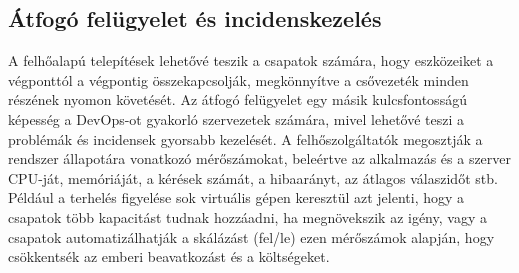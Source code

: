 \subsection*{Átfogó felügyelet és incidenskezelés}
A felhőalapú telepítések lehetővé teszik a csapatok számára, hogy eszközeiket a végponttól a végpontig összekapcsolják, megkönnyítve a csővezeték minden részének nyomon követését. Az átfogó felügyelet egy másik kulcsfontosságú képesség a DevOps-ot gyakorló szervezetek számára, mivel lehetővé teszi a problémák és incidensek gyorsabb kezelését. A felhőszolgáltatók megosztják a rendszer állapotára vonatkozó mérőszámokat, beleértve az alkalmazás és a szerver CPU-ját, memóriáját, a kérések számát, a hibaarányt, az átlagos válaszidőt stb. Például a terhelés figyelése sok virtuális gépen keresztül azt jelenti, hogy a csapatok több kapacitást tudnak hozzáadni, ha megnövekszik az igény, vagy a csapatok automatizálhatják a skálázást (fel/le) ezen mérőszámok alapján, hogy csökkentsék az emberi beavatkozást és a költségeket.
\cite{cloudComp}